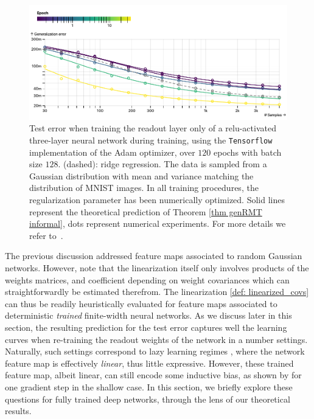 \begin{figure}[t]
    \centering
    \includegraphics[scale=0.6]{chapters/deeprf/figs/art_opt_emp1.pdf}
    \caption{
    Test error when training the readout layer only of a relu-activated three-layer neural network during training, using the \texttt{Tensorflow} implementation of the Adam \cite{kingma2014adam} optimizer, over $120$ epochs with batch size $128$. (dashed): ridge regression. The data is sampled from a Gaussian distribution with mean and variance matching the distribution of MNIST images. In all training procedures, the regularization parameter has been numerically optimized. Solid lines represent the theoretical prediction of Theorem \ref{thm genRMT informal}, dots represent numerical experiments. For more details we refer to~. 
    }
    \label{fig:inductive_bias}
\end{figure}


The previous discussion addressed feature maps associated to random Gaussian networks. However, note that the linearization itself only involves products of the weights matrices, and coefficient depending on weight covariances which can straightforwardly be estimated therefrom. The linearization \ref{def: linearized_covs} can thus be readily heuristically evaluated  for feature maps associated to deterministic \textit{trained} finite-width neural networks. As we discuss later in this section, the resulting prediction for the test error captures well the learning curves when re-training the readout weights of the network in a number settings. Naturally, such settings correspond to lazy learning regimes \cite{Jacot2020}, where the network feature map is effectively \textit{linear}, thus little expressive. However, these trained feature map, albeit linear, can still encode some inductive bias, as shown by \cite{Ba2022} for one gradient step in the shallow case. In this section, we briefly explore these questions for fully trained deep networks, through the lens of our theoretical results.

